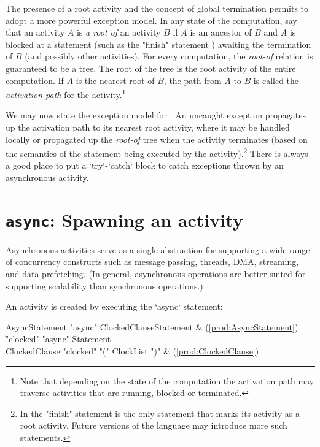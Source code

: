 The presence of a root activity and the concept of global termination permits
\Xten{} to adopt a more powerful exception model. In any state of the
computation, say that an activity $A$ is {\em a root of} an activity $B$ if
$A$ is an ancestor of $B$ and $A$ is blocked at a statement (such as the
\xcd"finish" statement ) awaiting the termination of $B$ (and
possibly other activities). For every \Xten{} computation, the \emph{root-of}
relation is guaranteed to be a tree. The root of the tree is the root activity
of the entire computation. If $A$ is the nearest root of $B$, the path from
$A$ to $B$ is called the {\em activation path} for the activity.\footnote{Note
  that depending on the state of the computation the activation path may
  traverse activities that are running, blocked or terminated.}

We may now state the exception model for \Xten.  An uncaught exception
propagates up the activation path to its nearest root activity, where
it may be handled locally or propagated up the \emph{root-of} tree when
the activity terminates (based on the semantics of the statement being
executed by the activity).\footnote{In \XtenCurrVer{} the \xcd"finish"
statement is the only statement that marks its activity as a root
activity. Future versions of the language may introduce more such
statements.}  
There is always a good place to put a \xcd`try`-\xcd`catch` block to catch
exceptions thrown by an asynchronous activity.

\section{{\tt async}: Spawning an activity}\label{AsynchronousActivity}\label{AsyncActivity}

Asynchronous activities serve as a single abstraction for supporting a
wide range of concurrency constructs such as message passing, threads,
DMA, streaming, and data prefetching. (In general, asynchronous operations
are better suited for supporting scalability than synchronous
operations.)

An activity is created by executing the \xcd`async` statement: 

\begin{bbgrammar}
      AsyncStatement \: \xcd"async" ClockedClause\opt Statement & (\ref{prod:AsyncStatement}) \\
                    \| \xcd"clocked" \xcd"async" Statement \\
       ClockedClause \: \xcd"clocked" \xcd"(" ClockList \xcd")" & (\ref{prod:ClockedClause}) \\
\end{bbgrammar}


